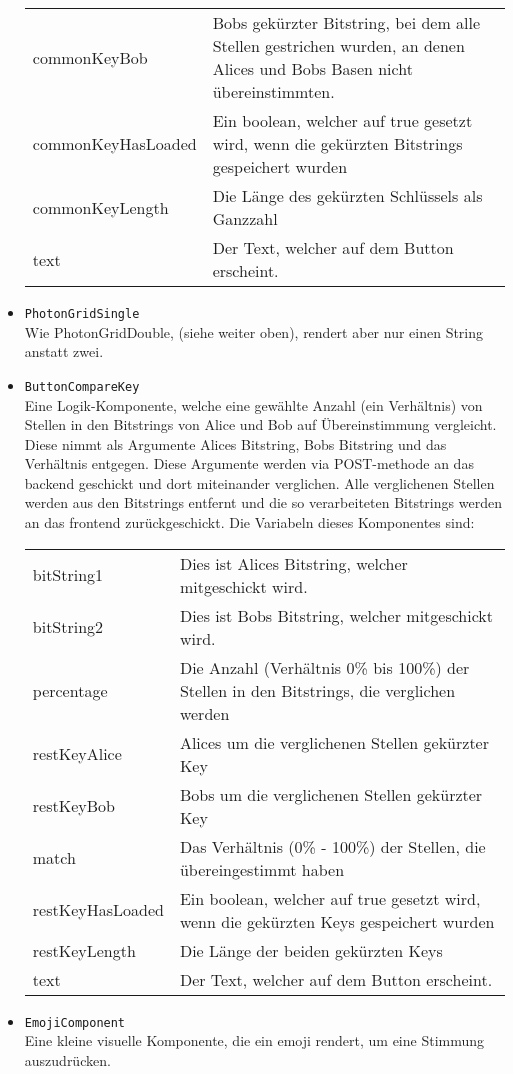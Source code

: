 \documentclass[a4paper,10.2pt,pdftex]{scrartcl}%
\begin{document}
\begin{itemize}
\begin{tabularx}{\textwidth}{p{3cm}p{11cm}}
commonKeyBob & Bobs gekürzter Bitstring, bei dem alle Stellen gestrichen wurden, an denen Alices und Bobs Basen nicht übereinstimmten. \\
commonKeyHasLoaded &  Ein boolean, welcher auf true gesetzt wird, wenn die gekürzten Bitstrings gespeichert wurden \\
commonKeyLength &  Die Länge des gekürzten Schlüssels als Ganzzahl \\
text &  Der Text, welcher auf dem Button erscheint.
\end{tabularx}
\item \texttt{PhotonGridSingle} \\
Wie PhotonGridDouble, (siehe weiter oben), rendert aber nur einen String anstatt zwei. \\
\item \texttt{ButtonCompareKey} \\
Eine Logik-Komponente, welche eine gewählte Anzahl (ein Verhältnis) von Stellen in den Bitstrings von Alice und Bob auf Übereinstimmung vergleicht. Diese nimmt als Argumente Alices Bitstring, Bobs Bitstring und das Verhältnis entgegen. Diese Argumente werden via POST-methode an das backend geschickt und dort miteinander verglichen. Alle verglichenen Stellen werden aus den Bitstrings entfernt und die so verarbeiteten Bitstrings werden an das frontend zurückgeschickt. Die Variabeln dieses Komponentes sind:
\begin{tabularx}{\textwidth}{p{3cm}p{11cm}} \\
bitString1 &  Dies ist Alices Bitstring, welcher mitgeschickt wird. \\
bitString2 &  Dies ist Bobs Bitstring, welcher mitgeschickt wird. \\
percentage &  Die Anzahl (Verhältnis 0\% bis 100\%) der Stellen in den Bitstrings, die verglichen werden \\
restKeyAlice &  Alices um die verglichenen Stellen gekürzter Key \\
restKeyBob &  Bobs um die verglichenen Stellen gekürzter Key \\
match & Das Verhältnis (0\% - 100\%) der Stellen, die übereingestimmt haben \\
restKeyHasLoaded &  Ein boolean, welcher auf true gesetzt wird, wenn die gekürzten Keys gespeichert wurden \\
restKeyLength &  Die Länge der beiden gekürzten Keys \\
text & Der Text, welcher auf dem Button erscheint.
\end{tabularx}
\item \texttt{EmojiComponent} \\
Eine kleine visuelle Komponente, die ein emoji rendert, um eine Stimmung auszudrücken.
\end{itemize}
\end{document}
